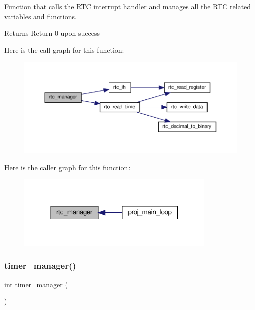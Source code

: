 Function that calls the R\+TC interrupt handler and manages all the R\+TC related variables and functions. 

\begin{DoxyReturn}{Returns}
Return 0 upon success 
\end{DoxyReturn}
Here is the call graph for this function\+:
\nopagebreak
\begin{figure}[H]
\begin{center}
\leavevmode
\includegraphics[width=350pt]{group__main__functions_gac1cad6d7c8507831aa74d165972cb1a9_cgraph}
\end{center}
\end{figure}
Here is the caller graph for this function\+:
\nopagebreak
\begin{figure}[H]
\begin{center}
\leavevmode
\includegraphics[width=269pt]{group__main__functions_gac1cad6d7c8507831aa74d165972cb1a9_icgraph}
\end{center}
\end{figure}
\mbox{\label{group__main__functions_ga230337632aac7d793969e926a66f0249}} 
\subsubsection{\texorpdfstring{timer\+\_\+manager()}{timer\_manager()}}
{\footnotesize\ttfamily int timer\+\_\+manager (\begin{DoxyParamCaption}{ }\end{DoxyParamCaption})}



